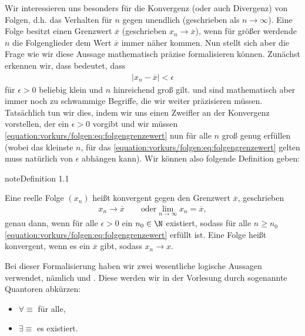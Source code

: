 \documentclass[letterpaper,10pt,english]{jupyterBook}
\begin{document}
Wir interessieren uns besonders für die Konvergenz (oder auch Divergenz) von Folgen, d.h. das Verhalten für \(n\) gegen unendlich (geschrieben als \(n \rightarrow \infty\)). Eine  Folge besitzt einen Grenzwert \(\overline{x}\)
(geschrieben \(x_n \rightarrow \overline{x}\)), wenn für größer werdende \(n\) die Folgenglieder dem Wert \(\overline{x}\) immer näher kommen. Nun stellt sich aber die Frage wie wir diese Aussage mathematisch präzise formalisieren können. Zunächst erkennen wir, dass   bedeutet, dass
\begin{equation}\label{equation:vorkurs/folgen:eq:folgengrenzewert}
\begin{split}\vert x_n - \overline{x} \vert < \epsilon\end{split}
\end{equation}
für \(\epsilon > 0\) beliebig klein und \(n\) hinreichend groß gilt.  und   sind mathematisch aber immer noch zu schwammige Begriffe, die wir weiter präzisieren müssen. Tatsächlich tun wir dies, indem wir uns einen Zweifler an der Konvergenz vorstellen, der ein \(\epsilon > 0\) vorgibt und wir müssen \eqref{equation:vorkurs/folgen:eq:folgengrenzewert} nun für alle \(n\) groß genug erfüllen (wobei das kleinste \(n\), für das \eqref{equation:vorkurs/folgen:eq:folgengrenzewert} gelten muss natürlich von \(\epsilon\) abhängen kann). Wir können also folgende Definition geben:
\label{vorkurs/folgen:definition-0}
\begin{sphinxadmonition}{note}{Definition 1.1}



Eine reelle Folge \((x_n)\) heißt konvergent gegen den Grenzwert \(\overline{x}\), geschrieben
\begin{equation*}
\begin{split}x_n \rightarrow \overline{x} \qquad \text{oder} \lim_{n \rightarrow \infty} x_n = \overline{x},\end{split}
\end{equation*}
genau dann, wenn für alle \(\epsilon > 0\) ein \(n_0 \in \N\) existiert, sodass für alle \(n \geq n_0\) \eqref{equation:vorkurs/folgen:eq:folgengrenzewert} erfüllt ist.
Eine Folge heißt konvergent, wenn es ein \(\overline{x}\) gibt, sodass \(x_n \rightarrow x\).
\end{sphinxadmonition}

Bei dieser Formalisierung haben wir zwei wesentliche logische Aussagen verwendet, nämlich  und . Diese werden wir in der Vorlesung durch sogenannte Quantoren abkürzen:
\begin{itemize}
\item {} 
\(\forall \equiv\) für alle,

\item {} 
\(\exists \equiv\) es existiert.

\end{itemize}
\end{document}
